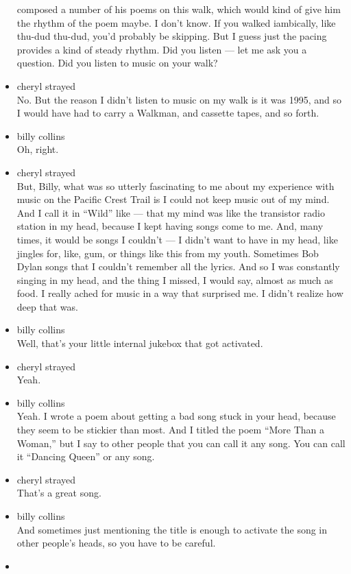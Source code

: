 \begin{itemize}
  composed a number of his poems on this walk, which would kind of give
  him the rhythm of the poem maybe. I don't know. If you walked
  iambically, like thu-dud thu-dud, you'd probably be skipping. But I
  guess just the pacing provides a kind of steady rhythm. Did you listen
  --- let me ask you a question. Did you listen to music on your walk?
\item
  cheryl strayed\\
  No. But the reason I didn't listen to music on my walk is it was 1995,
  and so I would have had to carry a Walkman, and cassette tapes, and so
  forth.
\item
  billy collins\\
  Oh, right.
\item
  cheryl strayed\\
  But, Billy, what was so utterly fascinating to me about my experience
  with music on the Pacific Crest Trail is I could not keep music out of
  my mind. And I call it in ``Wild'' like --- that my mind was like the
  transistor radio station in my head, because I kept having songs come
  to me. And, many times, it would be songs I couldn't --- I didn't want
  to have in my head, like jingles for, like, gum, or things like this
  from my youth. Sometimes Bob Dylan songs that I couldn't remember all
  the lyrics. And so I was constantly singing in my head, and the thing
  I missed, I would say, almost as much as food. I really ached for
  music in a way that surprised me. I didn't realize how deep that was.
\item
  billy collins\\
  Well, that's your little internal jukebox that got activated.
\item
  cheryl strayed\\
  Yeah.
\item
  billy collins\\
  Yeah. I wrote a poem about getting a bad song stuck in your head,
  because they seem to be stickier than most. And I titled the poem
  ``More Than a Woman,'' but I say to other people that you can call it
  any song. You can call it ``Dancing Queen'' or any song.
\item
  cheryl strayed\\
  That's a great song.
\item
  billy collins\\
  And sometimes just mentioning the title is enough to activate the song
  in other people's heads, so you have to be careful.
\item

\end{itemize}

